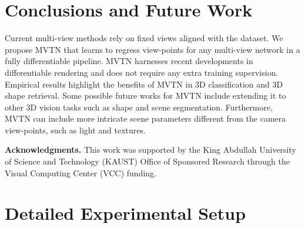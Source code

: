 \documentclass[10pt,twocolumn,letterpaper]{article}
\newcommand{\mysection}[1]{\noindent\textbf{#1.}}
\begin{document}
\begin{table}[t]

\tabcolsep=0.11cm
\centering
{}
\vspace{2pt}
\caption{\small \textbf{Time and Memory Requirements}. We assess the contribution of the MVTN module to the time and memory requirements in the multi-view pipeline. We note that the MVTN's time and memory requirements are negligible.}
\label{tbl:speed}
\end{table}



\section{Conclusions and Future Work} \label{sec:conclusion}
 Current multi-view methods rely on fixed views aligned with the dataset. We propose MVTN that learns to regress view-points for any multi-view network in a fully differentiable pipeline. MVTN harnesses recent developments in differentiable rendering and does not require any extra training supervision. Empirical results highlight the benefits of MVTN in 3D classification and 3D shape retrieval.  Some possible future works for MVTN include extending it to other 3D vision tasks such as shape and scene segmentation. Furthermore, MVTN can include more intricate scene parameters different from the camera view-points, such as light and textures. 
 
 \mysection{Acknowledgments} This work was supported by the King Abdullah University of Science and Technology (KAUST) Office of Sponsored Research through the Visual Computing Center (VCC) funding.




{\small


}
\clearpage \clearpage
\appendix

\section{Detailed Experimental Setup}
\end{document}
